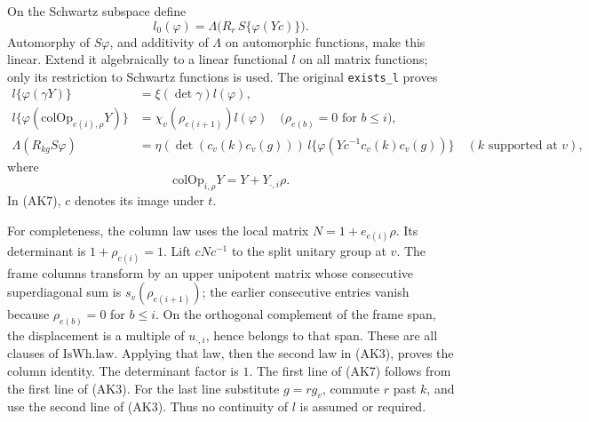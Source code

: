 On the Schwartz subspace define
\[
 l_0(\varphi)=
       \Lambda\bigl(R_r\,S\{\varphi(Yc)\}\bigr).
\]
Automorphy of \(S\varphi\), and additivity of \(\Lambda\) on
automorphic functions, make this linear.
Extend it algebraically to a linear functional \(l\) on all
matrix functions; only its restriction to Schwartz functions is used.
The original \texttt{exists\_l} proves
\[
 \begin{split}
 l\{\varphi(\gamma Y)\}&=\xi(\det\gamma)l(\varphi),\\
 l\{\varphi(\mathrm{colOp}_{e(i),\rho}Y)\}
       &=\chi_v(\rho_{e(i+1)})l(\varphi)
       \quad\bigl(\rho_{e(b)}=0\text{ for }b\le i\bigr),\\
 \Lambda(R_{kg}S\varphi)
       &=\eta(\det(c_v(k)c_v(g)))\,
          l\{\varphi(Yc^{-1}c_v(k)c_v(g))\}
                  \quad(k\text{ supported at }v),
 \end{split}\tag{AK7}\label{eq:sr-source-local-whittaker-distribution}
\]
where
\[
 \mathrm{colOp}_{i,\rho}Y
                  =Y+Y_{\cdot,i}\rho .
\]
In (AK7), \(c\) denotes its image under \(t\).

For completeness, the column law uses the local matrix
\(N=1+e_{e(i)}\rho\). Its determinant is \(1+\rho_{e(i)}=1\).
Lift \(cNc^{-1}\) to the split unitary group at \(v\).
The frame columns transform by an upper unipotent matrix whose
consecutive superdiagonal sum is \(s_v(\rho_{e(i+1)})\);
the earlier consecutive entries vanish because
\(\rho_{e(b)}=0\) for \(b\le i\).
On the orthogonal complement of the frame span, the displacement
is a multiple of \(u_{\cdot,i}\), hence belongs to that span.
These are all clauses of \(\mathrm{IsWh.law}\).
Applying that law, then the second law in (AK3), proves the column
identity. The determinant factor is \(1\).
The first line of (AK7) follows from the first line of (AK3).
For the last line substitute \(g=r g_v\), commute \(r\) past \(k\),
and use the second line of (AK3). Thus no continuity of \(l\) is
assumed or required.


